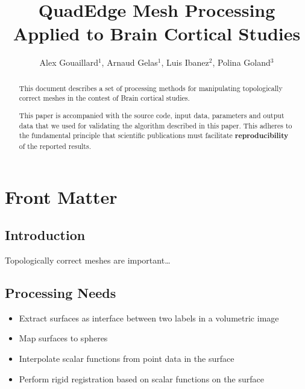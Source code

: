 \documentclass{InsightArticle}
\title{QuadEdge Mesh Processing Applied to Brain Cortical Studies}
\author{Alex Gouaillard$^{1}$, Arnaud Gelas$^{1}$, Luis Ibanez$^{2}$, Polina Goland$^{3}$}
\begin{document}
\ifpdf
\else
\fi


\maketitle


\ifhtml
\chapter*{Front Matter\label{front}}
\fi


\begin{abstract}
\noindent
This document describes a set of processing methods for manipulating
topologically correct meshes in the contest of Brain cortical studies. 

This paper is accompanied with the source code, input data, parameters and
output data that we used for validating the algorithm described in this paper.
This adheres to the fundamental principle that scientific publications must
facilitate \textbf{reproducibility} of the reported results.
\end{abstract}

\tableofcontents

\section{Introduction}

Topologically correct meshes are important\ldots

\section{Processing Needs}

\begin{itemize}
\item Extract surfaces as interface between two labels in a volumetric image
\item Map surfaces to spheres
\item Interpolate scalar functions from point data in the surface
\item Perform rigid registration based on scalar functions on the surface
\end{itemize}
\end{document}
